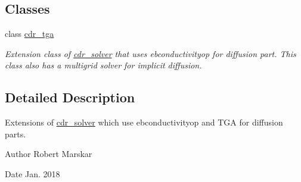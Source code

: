 \subsection*{Classes}
\begin{DoxyCompactItemize}
\item 
class \hyperlink{classcdr__tga}{cdr\+\_\+tga}
\begin{DoxyCompactList}\small\item\em Extension class of \hyperlink{classcdr__solver}{cdr\+\_\+solver} that uses ebconductivityop for diffusion part. This class also has a multigrid solver for implicit diffusion. \end{DoxyCompactList}\end{DoxyCompactItemize}


\subsection{Detailed Description}
Extensions of \hyperlink{classcdr__solver}{cdr\+\_\+solver} which use ebconductivityop and T\+GA for diffusion parts. 

\begin{DoxyAuthor}{Author}
Robert Marskar 
\end{DoxyAuthor}
\begin{DoxyDate}{Date}
Jan. 2018 
\end{DoxyDate}
